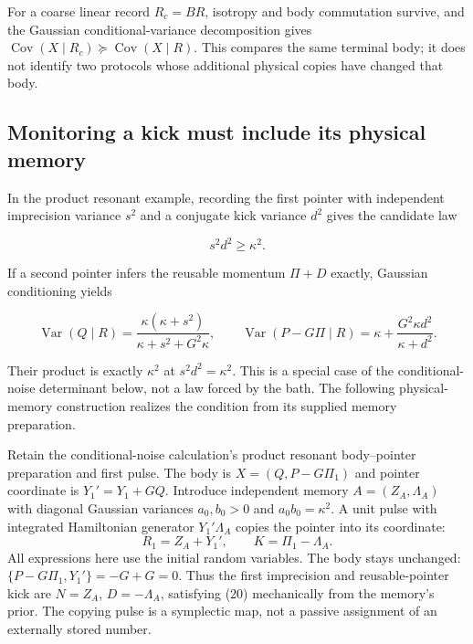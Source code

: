\documentclass[11pt,a4paper]{article}
\begin{document}
For a coarse linear record \(R_c=BR\), isotropy and body commutation
survive, and the Gaussian conditional-variance decomposition gives
\(\operatorname{Cov}(X\mid R_c)\succeq\operatorname{Cov}(X\mid R)\).
This compares the same terminal body; it does not identify two protocols
whose additional physical copies have changed that body.

\hypertarget{monitoring-a-kick-must-include-its-physical-memory}{%
\subsection{Monitoring a kick must include its physical
memory}\label{monitoring-a-kick-must-include-its-physical-memory}}

In the product resonant example, recording the first pointer with
independent imprecision variance \(s^2\) and a conjugate kick variance
\(d^2\) gives the candidate law

\[s^2d^2\ge\kappa^2.\tag{20}\]

If a second pointer infers the reusable momentum \(\Pi+D\) exactly,
Gaussian conditioning yields

\[\operatorname{Var}(Q\mid R)=
\frac{\kappa(\kappa+s^2)}{\kappa+s^2+G^2\kappa},\qquad
\operatorname{Var}(P-G\Pi\mid R)=
\kappa+\frac{G^2\kappa d^2}{\kappa+d^2}.\tag{21}\]

Their product is exactly \(\kappa^2\) at \(s^2d^2=\kappa^2\). This is a
special case of the conditional-noise determinant below, not a law
forced by the bath. The following physical-memory construction realizes
the condition from its supplied memory preparation.

Retain the conditional-noise calculation's product resonant
body--pointer preparation and first pulse. The body is
\(X=(Q,P-G\Pi_1)\) and pointer coordinate is \(Y_1'=Y_1+GQ\). Introduce
independent memory \(A=(Z_A,\Lambda_A)\) with diagonal Gaussian
variances \(a_0,b_0>0\) and \(a_0b_0=\kappa^2\). A unit pulse with
integrated Hamiltonian generator \(Y_1'\Lambda_A\) copies the pointer
into its coordinate: \[R_1=Z_A+Y_1',\qquad K=\Pi_1-\Lambda_A.
\tag{50}\] All expressions here use the initial random variables. The
body stays unchanged: \(\{P-G\Pi_1,Y_1'\}=-G+G=0\). Thus the first
imprecision and reusable-pointer kick are \(N=Z_A\), \(D=-\Lambda_A\),
satisfying (20) mechanically from the memory's prior. The copying pulse
is a symplectic map, not a passive assignment of an externally stored
number.
\end{document}
